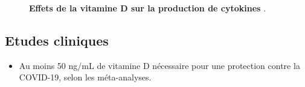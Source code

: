 \documentclass[
  a4paper,
  DIV=11,
  numbers=noendperiod,
  listof=totoc]{scrreprt}
\providecommand{\tightlist}{%
  \setlength{\itemsep}{0pt}\setlength{\parskip}{0pt}}\usepackage{longtable,booktabs,array}
\begin{document}
\begin{figure}


\caption[Effets de la vitamine D sur la production de
cytokines]{\label{fig-vd-dose-cytokine}\textbf{Effets de la vitamine D
sur la production de cytokines} \autocite{Zhang.2012}.}

\end{figure}%

\subsection{Etudes cliniques}\label{etudes-cliniques}

\begin{itemize}
\tightlist
\item
  Au moins 50 ng/mL de vitamine D nécessaire pour une protection contre
  la COVID-19, selon les méta-analyses. \autocites[
  ]{Borsche.2021}{Wimalawansa.2022}
\end{itemize}
\end{document}
